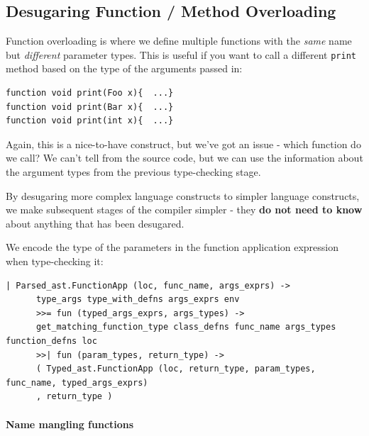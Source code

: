 \hypertarget{desugaring-function--method-overloading}{%
\subsection{\texorpdfstring{\protect\hyperlink{desugaring-function--method-overloading}{}Desugaring
Function / Method
Overloading}{Desugaring Function / Method Overloading}}\label{desugaring-function--method-overloading}}

Function overloading is where we define multiple functions with the
\emph{same} name but \emph{different} parameter types. This is useful if
you want to call a different \texttt{print} method based on the type of
the arguments passed in:

%

\begin{verbatim}
function void print(Foo x){  ...}
function void print(Bar x){  ...}
function void print(int x){  ...}
\end{verbatim}

Again, this is a nice-to-have construct, but we've got an issue - which
function do we call? We can't tell from the source code, but we can use
the information about the argument types from the previous type-checking
stage.

By desugaring more complex language constructs to simpler language
constructs, we make subsequent stages of the compiler simpler - they
\textbf{do not need to know} about anything that has been desugared.

We encode the type of the parameters in the function application
expression when type-checking it:

\begin{lstlisting}[language=caml,caption={type\_expr.ml}]
| Parsed_ast.FunctionApp (loc, func_name, args_exprs) ->
      type_args type_with_defns args_exprs env
      >>= fun (typed_args_exprs, args_types) ->
      get_matching_function_type class_defns func_name args_types function_defns loc
      >>| fun (param_types, return_type) ->
      ( Typed_ast.FunctionApp (loc, return_type, param_types, func_name, typed_args_exprs)
      , return_type )
\end{lstlisting}

\hypertarget{name-mangling-functions}{%
\paragraph{\texorpdfstring{\protect\hyperlink{name-mangling-functions}{}Name
mangling
functions}{Name mangling functions}}\label{name-mangling-functions}}

